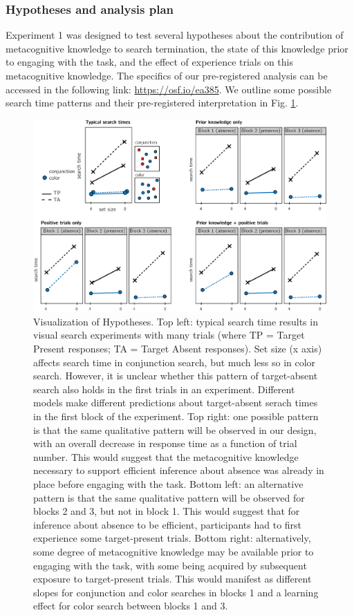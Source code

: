 \documentclass[
  english,
  man]{apa6}
\begin{document}
\hypertarget{hypotheses-and-analysis-plan}{%
\subsubsection{Hypotheses and analysis plan}\label{hypotheses-and-analysis-plan}}

Experiment 1 was designed to test several hypotheses about the contribution of metacognitive knowledge to search termination, the state of this knowledge prior to engaging with the task, and the effect of experience trials on this metacognitive knowledge. The specifics of our pre-registered analysis can be accessed in the following link: \url{https://osf.io/ea385}. We outline some possible search time patterns and their pre-registered interpretation in Fig. \ref{fig:models}.

\begin{figure}
\includegraphics[width=\textwidth]{figures/models} \caption{Visualization of Hypotheses. Top left: typical search time results in visual search experiments with many trials (where TP =  Target Present responses; TA = Target Absent responses). Set size (x axis) affects search time in conjunction search, but much less so in color search. However, it is unclear whether this pattern of target-absent search also holds in the first trials in an experiment. Different models make different predictions about target-absent serach times in the first block of the experiment. Top right: one possible pattern is that the same qualitative pattern will be observed in our design, with an overall decrease in response time as a function of trial number. This would suggest that the metacognitive knowledge necessary to support efficient inference about absence was already in place before engaging with the task. Bottom left: an alternative pattern is that the same qualitative pattern will be observed for blocks 2 and 3, but not in block 1. This would suggest that for inference about absence to be efficient, participants had to first experience some target-present trials. Bottom right: alternatively, some degree of metacognitive knowledge may be available prior to engaging with the task, with some being acquired by subsequent exposure to target-present trials. This would manifest as different slopes for conjunction and color searches in blocks 1 and a learning effect for color search between blocks 1 and 3.}\label{fig:models}
\end{figure}
\end{document}
